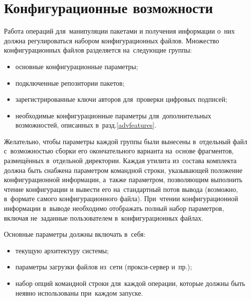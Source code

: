 \section{Конфигурационные возможности}

Работа операций для~манипуляции пакетами и получения информации о~них должна регулироваться набором конфигурационных файлов.
Множество конфигурационных файлов разделяется на~следующие группы:

\begin{itemize}
\item{основные конфигурационные параметры;}
\item {подключенные репозитории пакетов;}
\item {зарегистрированные ключи авторов для~проверки цифровых подписей;}
\item{необходимые конфигурационные параметры для~дополнительных возможностей, описанных в~разд.\ref{advfeatures}.}
\end{itemize}

Желательно, чтобы параметры каждой группы были вынесены в~отдельный файл с~возможностью 
сборки его окончательного варианта на~основе фрагментов, размещённых в~отдельной директории.
Каждая утилита из~состава комплекта должна быть снабжена параметром командной строки,
указывающей положение конфигурационной информации,
а~также параметром, позволяющим выполнить чтение конфигурации и вывести его на~стандартный потов вывода (возможно, в~формате самого конфигурационного файла). 
При~чтении конфигурационной информации в~выводе необходимо    отображать 
полный набор параметров, включая не~заданные пользователем в~конфигурационных файлах.

Основные параметры должны включать в~себя:

\begin{itemize}
\item {текущую архитектуру системы;}
\item {параметры загрузки файлов из~сети (прокси-сервер и~пр.);}
\item {набор опций командной строки для~каждой операции, которые должны быть неявно использованы при~каждом запуске.}
\end{itemize}


